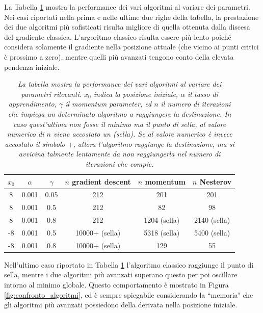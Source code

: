\documentclass{article}
\begin{document}
La Tabella \ref{tab:dati} mostra la performance dei vari algoritmi al variare dei parametri. Nei casi riportati nella prima e nelle ultime due righe della tabella, la prestazione dei due algoritmi più sofisticati risulta migliore di quella ottenuta dalla discesa del gradiente classica. 
L'argoritmo classico risulta essere più lento poiché considera solamente il gradiente nella posizione attuale (che vicino ai punti critici è prossimo a zero), mentre quelli più avanzati tengono conto della elevata pendenza iniziale.


\begin{table}[htb]
    \centering
    \begin{tabular}[]{|c|c|c|c|c|c|}
        \hline
        $x_0$ & $\alpha$ & $\gamma$ & $n$ gradient descent & $n$ momentum & $n$ Nesterov\\
        \hline
        8 & 0.001 & 0.05 & 212 & 201 & 201\\
        8 & 0.001 & 0.5 & 212 & 82 & 98\\
        8 &  0.001 & 0.8 & 212 & 1204 (sella) & 2140 (sella)\\
        -8 & 0.001 & 0.5 & 10000+ (sella) & 5318 (sella) & 5400 (sella)\\
        -8 & 0.001 & 0.8 & 10000+ (sella) & 129 & 55\\
        \hline
    \end{tabular}
\caption{\emph{La tabella mostra la performance dei vari algoritmi al variare dei parametri rilevanti.
$x_0$ indica la posizione iniziale, $\alpha$ il tasso di apprendimento, $\gamma$ il momentum parameter, ed $n$ il numero di iterazioni che impiega un determinato algoritmo a raggiungere la destinazione.
In caso quest'ultima non fosse il minimo ma il punto di sella, al valore numerico di $n$ viene accostato un \emph{(sella)}. Se al valore numerico è invece accostato il simbolo $+$,
allora l'algoritmo raggiunge la destinazione, ma si avvicina talmente lentamente da non raggiungerla nel numero di iterazioni che compie.}}
\label{tab:dati}
\end{table}

Nell'ultimo caso riportato in Tabella \ref{tab:dati} l'algoritmo classico raggiunge il punto di sella, mentre i due algoritmi più avanzati superano questo per poi oscillare intorno al minimo globale.
Questo comportamento è mostrato in Figura \ref{fig:confronto_algoritmi}, ed è sempre spiegabile considerando la ``memoria" che gli algoritmi più avanzati possiedono della derivata nella posizione iniziale.
\end{document}
